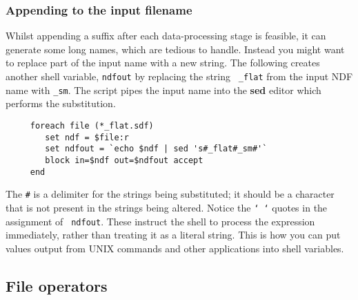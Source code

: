 \documentclass[twoside,11pt]{article}
\newcommand{\htmlref}[2]{#1}
\newcommand{\xlabel}[1]{}
\begin{document}
\subsubsection{\xlabel{sc4_se_filename_substitution}Appending to the input
filename\label{sc4_se_filename_substitution}}

Whilst appending a suffix after each data-processing stage is
feasible, it can generate some long names, which are tedious to
handle.  Instead you might want to replace part of the input name with
a new string.  The following creates another \htmlref{shell
variable}{sc4_se_variables}, {\tt ndfout} by replacing the string {\tt
\_flat} from the input NDF name with {\tt \_sm}.  The script
\htmlref{{\sf pipes}}{sc4_gl_pipe} the input name into the {\bf sed}
editor which performs the substitution. 

\small
\begin{verbatim}
     foreach file (*_flat.sdf)
        set ndf = $file:r
        set ndfout = `echo $ndf | sed 's#_flat#_sm#'`
        block in=$ndf out=$ndfout accept
     end
\end{verbatim}
\normalsize
The {\tt \#} is a delimiter for the strings being substituted; it
should be a character that is not present in the strings being
altered.  Notice the {\tt ` `} quotes in the assignment of {\tt
ndfout}.  These instruct the shell to process the expression
immediately, rather than treating it as a literal string.  This is how
you can put values output from UNIX commands and other applications into
shell variables.

\subsection{\xlabel{sc4_se_file_operators}File operators
\label{sc4_se_file_operators}}
\end{document}
